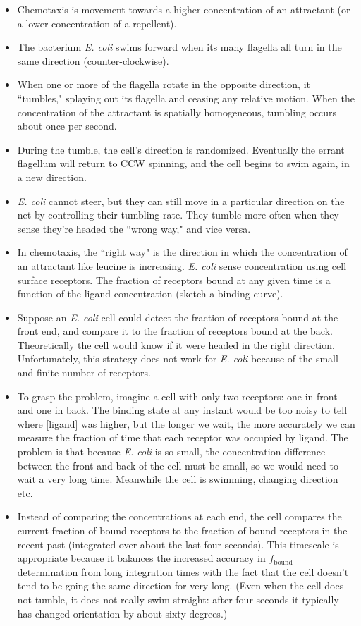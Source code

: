 \documentclass{article}
\begin{document}
\begin{itemize}
\item Chemotaxis is movement towards a higher concentration of an attractant (or a lower concentration of a repellent).
\item The bacterium \textit{E. coli} swims forward when its many flagella all turn in the same direction (counter-clockwise).
\item  When one or more of the flagella rotate in the opposite direction,  it ``tumbles," splaying out its flagella and ceasing any relative motion. When the concentration of the attractant is spatially homogeneous, tumbling occurs about once per second.
\item During the tumble, the cell's direction is randomized. Eventually the errant flagellum will return to CCW spinning, and the cell begins to swim again, in a new direction.
\item \textit{E. coli} cannot steer, but they can still move in a particular direction on the net by controlling their tumbling rate. They tumble more often when they sense they're headed the ``wrong way," and vice versa.
\item In chemotaxis, the ``right way" is the direction in which the concentration of an attractant like leucine is increasing. \textit{E. coli} sense concentration using cell surface receptors. The fraction of receptors bound at any given time is a function of the ligand concentration (sketch a binding curve).
\item Suppose an \textit{E. coli} cell could detect the fraction of receptors bound at the front end, and compare it to the fraction of receptors bound at the back. Theoretically the cell would know if it were headed in the right direction. Unfortunately, this strategy does not work for \textit{E. coli} because of the small and finite number of receptors.
\item To grasp the problem, imagine a cell with only two receptors: one in front and one in back. The binding state at any instant would be too noisy to tell where [ligand] was higher, but the longer we wait, the more accurately we can measure the fraction of time that each receptor was occupied by ligand. The problem is that because \textit{E. coli} is so small, the concentration difference between the front and back of the cell must be small, so we would need to wait a very long time. Meanwhile the cell is swimming, changing direction etc.
\item Instead of comparing the concentrations at each end, the cell compares the current fraction of bound receptors to the fraction of bound receptors in the recent past (integrated over about the last four seconds). This timescale is appropriate because it balances the increased accuracy in $f_{\textrm{bound}}$ determination from long integration times with the fact that the cell doesn't tend to be going the same direction for very long. (Even when the cell does not tumble, it does not really swim straight: after four seconds it typically has changed orientation by about sixty degrees.)
\end{itemize}
\end{document}
